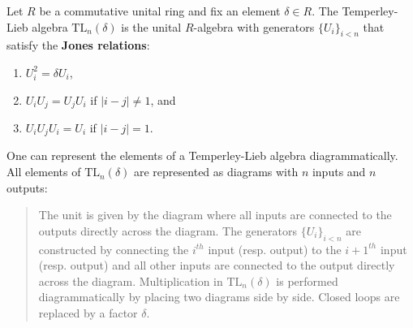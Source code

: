     \begin{example}
        Let $R$ be a commutative unital ring and fix an element $\delta\in R$. The Temperley-Lieb algebra $\text{TL}_n(\delta)$ is the unital $R$-algebra with generators $\{U_i\}_{i<n}$ that satisfy the \textbf{Jones relations}:
        \begin{enumerate}
            \item $U_i^2 = \delta U_i$,
            \item $U_i U_j = U_j U_i$ if $|i-j|\neq 1$, and
            \item $U_i U_j U_i = U_i$ if $|i-j| = 1$.
        \end{enumerate}
        One can represent the elements of a Temperley-Lieb algebra diagrammatically. All elements of $\text{TL}_n(\delta)$ are represented as diagrams with $n$ inputs and $n$ outputs:
        \begin{quote}
            The unit is given by the diagram where all inputs are connected to the outputs directly across the diagram. The generators $\{U_i\}_{i<n}$ are constructed by connecting the $i^{th}$ input (resp. output) to the $i+1^{th}$ input (resp. output) and all other inputs are connected to the output directly across the diagram. Multiplication in $\text{TL}_n(\delta)$ is performed diagrammatically by placing two diagrams side by side. Closed loops are replaced by a factor $\delta$.
        \end{quote}


\end{example}
